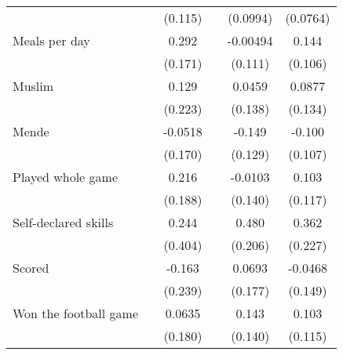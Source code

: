 {\begin{tabular}{l*{5}{c}}
                    &                     &     (0.115)         &                     &    (0.0994)         &    (0.0764)         \\
[1em]
Meals per day       &                     &       0.292\sym{*}  &                     &    -0.00494         &       0.144         \\
                    &                     &     (0.171)         &                     &     (0.111)         &     (0.106)         \\
[1em]
Muslim              &                     &       0.129         &                     &      0.0459         &      0.0877         \\
                    &                     &     (0.223)         &                     &     (0.138)         &     (0.134)         \\
[1em]
Mende               &                     &     -0.0518         &                     &      -0.149         &      -0.100         \\
                    &                     &     (0.170)         &                     &     (0.129)         &     (0.107)         \\
[1em]
Played whole game   &                     &       0.216         &                     &     -0.0103         &       0.103         \\
                    &                     &     (0.188)         &                     &     (0.140)         &     (0.117)         \\
[1em]
Self-declared skills&                     &       0.244         &                     &       0.480\sym{**} &       0.362         \\
                    &                     &     (0.404)         &                     &     (0.206)         &     (0.227)         \\
[1em]
Scored              &                     &      -0.163         &                     &      0.0693         &     -0.0468         \\
                    &                     &     (0.239)         &                     &     (0.177)         &     (0.149)         \\
[1em]
Won the football game&                     &      0.0635         &                     &       0.143         &       0.103         \\
                    &                     &     (0.180)         &                     &     (0.140)         &     (0.115)         \\

\end{tabular}}
